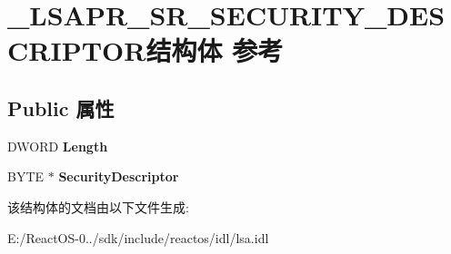 \hypertarget{struct___l_s_a_p_r___s_r___s_e_c_u_r_i_t_y___d_e_s_c_r_i_p_t_o_r}{}\section{\+\_\+\+L\+S\+A\+P\+R\+\_\+\+S\+R\+\_\+\+S\+E\+C\+U\+R\+I\+T\+Y\+\_\+\+D\+E\+S\+C\+R\+I\+P\+T\+O\+R结构体 参考}
\label{struct___l_s_a_p_r___s_r___s_e_c_u_r_i_t_y___d_e_s_c_r_i_p_t_o_r}
\subsection*{Public 属性}
\begin{DoxyCompactItemize}
\item 
\mbox{\label{struct___l_s_a_p_r___s_r___s_e_c_u_r_i_t_y___d_e_s_c_r_i_p_t_o_r_af808a21169bc1fdb031ae4a68a8813da}} 
D\+W\+O\+RD {\bfseries Length}
\item 
\mbox{\label{struct___l_s_a_p_r___s_r___s_e_c_u_r_i_t_y___d_e_s_c_r_i_p_t_o_r_a8acbc47e09af74afa0e22fc972d885d2}} 
B\+Y\+TE $\ast$ {\bfseries Security\+Descriptor}
\end{DoxyCompactItemize}


该结构体的文档由以下文件生成\+:\begin{DoxyCompactItemize}
\item 
E\+:/\+React\+O\+S-\/0../sdk/include/reactos/idl/lsa.\+idl\end{DoxyCompactItemize}
